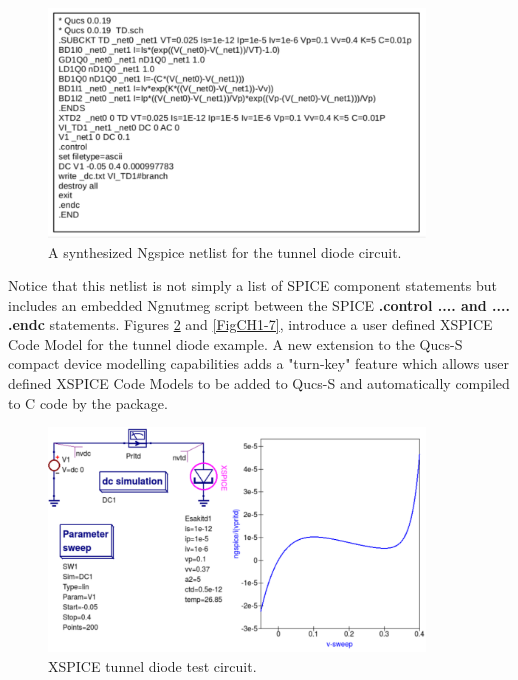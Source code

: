 \documentclass[10pt, a4paper]{report}
\begin{document}
\begin{figure}[h]
	\centering
	\includegraphics*[width=10cm]{pics/chap1/Qucs-S-CH1-Fig5.pdf}
	\caption{A synthesized Ngspice netlist for the tunnel diode circuit.}
	\label{FigCH1-5}
\end{figure}
Notice that this netlist is not simply a list of SPICE component statements but includes an embedded Ngnutmeg script between the SPICE \textbf{.control .... and .... .endc} statements.
Figures \ref{FigCH1-6} and \ref{FigCH1-7}, introduce a user defined XSPICE Code Model for the tunnel diode example. A new extension to the Qucs-S compact device modelling capabilities adds a "turn-key" feature which allows user defined XSPICE Code Models to be added to Qucs-S and automatically compiled to C code by the package. 
\begin{figure}[h]
	\centering
	\includegraphics[width=10cm]{pics/chap1/Qucs-S-CH1-Fig6.pdf}
	\caption{XSPICE tunnel diode test circuit.}
	\label{FigCH1-6}
\end{figure}
\end{document}
